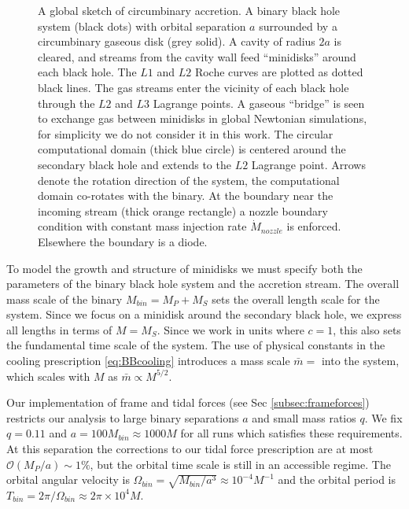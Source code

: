 \documentclass{emulateapj}
\newcommand{\Om}{\Omega}
\newcommand{\OO}{\mathcal{O}}
\begin{document}
\begin{figure}
\caption{\label{fi:domain} A global sketch of circumbinary accretion.  A binary black hole system (black dots) with orbital separation $a$ surrounded by a circumbinary gaseous disk (grey solid).  A cavity of radius $2a$ is cleared, and streams from the cavity wall feed ``minidisks'' around each black hole. The $L1$ and $L2$ Roche curves are plotted as dotted black lines.  The gas streams enter the vicinity of each black hole through the $L2$ and $L3$ Lagrange points.  A gaseous ``bridge'' is seen to exchange gas between minidisks in global Newtonian simulations, for simplicity we do not consider it in this work.  The circular computational domain (thick blue circle) is centered around the secondary black hole and extends to the $L2$ Lagrange point.  Arrows denote the rotation direction of the system, the computational domain co-rotates with the binary.  At the boundary near the incoming stream (thick orange rectangle) a nozzle boundary condition with constant mass injection rate $\dot{M}_{nozzle}$ is enforced.  Elsewhere the boundary is a diode.} 
\end{figure}

To model the growth and structure of minidisks we must specify both the parameters of the binary black hole system and the accretion stream.  The overall mass scale of the binary $M_{bin} = M_P+M_S$ sets the overall length scale for the system.  Since we focus on a minidisk around the secondary black hole, we express all lengths in terms of $M = M_S$.  Since we work in units where $c=1$, this also sets the fundamental time scale of the system. The use of physical constants in the cooling prescription \eqref{eq:BBcooling} introduces a mass scale $\bar{m}=$ into the system, which scales with $M$ as $\bar{m} \propto M^{5/2}$.  

Our implementation of frame and tidal forces (see Sec \ref{subsec:frameforces}) restricts our analysis to large binary separations $a$ and small mass ratios $q$.  We fix $q=0.11$ and $a = 100 M_{bin} \approx 1000 M$ for all runs which satisfies these requirements.  At this separation the corrections to our tidal force prescription are at most $\OO({M_P / a}) \sim 1\%$, but the orbital time scale is still in an accessible regime.  The orbital angular velocity is $\Om_{bin} = \sqrt{M_{bin} / a^3} \approx 10^{-4} M^{-1}$ and the orbital period is $T_{bin} = 2\pi / \Om_{bin} \approx 2 \pi \times 10^4 M$.
\end{document}
